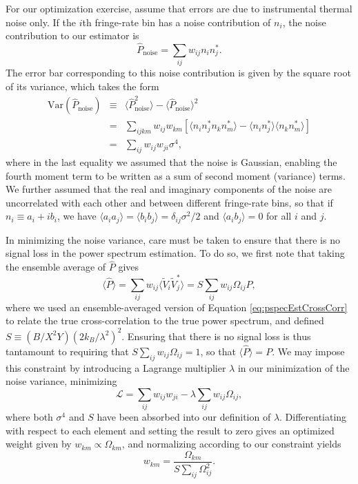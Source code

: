 \documentclass[twocolumn,apj,numberedappendix]{emulateapj}
\begin{document}
For our optimization exercise, assume that errors are due to instrumental thermal noise only. If the $i$th fringe-rate bin has a noise contribution of $n_i$, the noise contribution to our estimator is
\begin{equation}
\widehat{P}_\textrm{noise} = \sum_{ij} w_{ij} n_i n_j^*.
\end{equation}
The error bar corresponding to this noise contribution is given by the square root of its variance, which takes the form
\begin{eqnarray}
\textrm{Var}(\widehat{P}_\textrm{noise} ) &\equiv& \langle \widehat{P}_\textrm{noise}^2 \rangle - \langle \widehat{P}_\textrm{noise} \rangle^2 \nonumber \\
&= & \sum_{ijkm} w_{ij} w_{km} \left[ \langle n_i n_j^* n_k n_m^* \rangle - \langle n_i n_j^*\rangle \langle n_k n_m^* \rangle \right] \nonumber \\
&=&  \sum_{ij} w_{ij} w_{ji}\sigma^4,
\end{eqnarray}
where in the last equality we assumed that the noise is Gaussian, enabling the fourth moment term to be written as a sum of second moment (variance) terms. We further assumed that the real and imaginary components of the noise are uncorrelated with each other and between different fringe-rate bins, so that if $n_i \equiv a_i + i b_i$, we have $\langle a_i a_j \rangle = \langle b_i b_j \rangle = \delta_{ij} \sigma^2/2 $ and $\langle a_i b_j \rangle= 0$ for all $i$ and $j$.

In minimizing the noise variance, care must be taken to ensure that there is no signal loss in the power spectrum estimation. To do so, we first note that taking the ensemble average of $\widehat{P}$ gives
\begin{equation}
\langle \widehat{P} \rangle = \sum_{ij} w_{ij} \langle \widetilde{V}_i \widetilde{V}_j^* \rangle = S \sum_{ij} w_{ij} \Omega_{ij} P,
\end{equation}
where we used an ensemble-averaged version of Equation \eqref{eq:pspecEstCrossCorr} to relate the true cross-correlation to the true power spectrum, and defined $S \equiv ( B / X^2 Y) ( 2 k_B / \lambda^2 )^2$. Ensuring that there is no signal loss is thus tantamount to requiring that $ S \sum_{ij} w_{ij} \Omega_{ij} =1$, so that $\langle \widehat{P} \rangle = P$. We may impose this constraint by introducing a Lagrange multiplier $\lambda$ in our minimization of the noise variance, minimizing
\begin{equation}
\mathcal L = \sum_{ij} w_{ij} w_{ji} - \lambda \sum_{ij} w_{ij} \Omega_{ij},
\end{equation}
where both $\sigma^4$ and $S$ have been absorbed into our definition of $\lambda$. Differentiating with respect to each element and setting the result to zero gives an optimized weight given by $w_{km} \propto \Omega_{km}$, and normalizing according to our constraint yields
\begin{equation}
\label{eq:PspecOptWeights}
w_{km} = \frac{\Omega_{km}}{S \sum_{ij} \Omega_{ij}^2}.
\end{equation}
\end{document}
